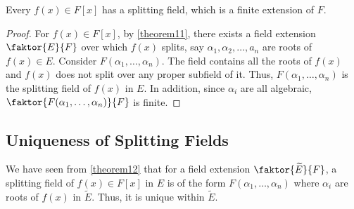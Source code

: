 \documentclass[11pt]{article}
\newcommand{\quotient}[2]{\faktor{#1}{#2}}
\begin{document}
\begin{theorem}
Every $f(x) \in F[x]$ has a splitting field, which is a finite extension of $F$.
\label{theorem12}
\end{theorem}
\begin{proof}
For $f(x) \in F[x]$, by \cref{theorem11}, there exists a field extension
$\quotient{E}{F}$ over which $f(x)$ splits, say $\alpha_1, \alpha_2, \dots, a_n$
are roots of $f(x) \in E$. Consider $F(\alpha_1,\dots,\alpha_n)$. The field
contains all the roots of $f(x)$ and $f(x)$ does not split over any proper
subfield of it. Thus, $F(\alpha_1,\dots,\alpha_n)$ is the splitting field of
$f(x)$ in $E$. In addition, since $\alpha_i$ are all algebraic,
$\quotient{F(\alpha_1,\dots,\alpha_n)}{F}$ is finite.
\end{proof}

\subsection{Uniqueness of Splitting Fields}
We have seen from \cref{theorem12} that for a field extension $\quotient{\tilde
E}{F}$, a splitting field of $f(x) \in F[x]$ in $E$ is of the form
$F(\alpha_1,\dots,\alpha_n)$ where $\alpha_i$ are roots of $f(x)$ in $\tilde E$.
Thus, it is unique within $\tilde E$.\\
\end{document}
